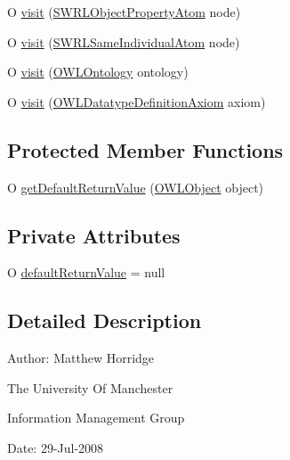 \begin{DoxyCompactItemize}
\item 
O \hyperlink{classorg_1_1semanticweb_1_1owlapi_1_1util_1_1_o_w_l_object_visitor_ex_adapter_3_01_o_01_4_ab8854cdd3a3703972d87a8ed1ac722f7}{visit} (\hyperlink{interfaceorg_1_1semanticweb_1_1owlapi_1_1model_1_1_s_w_r_l_object_property_atom}{S\-W\-R\-L\-Object\-Property\-Atom} node)
\item 
O \hyperlink{classorg_1_1semanticweb_1_1owlapi_1_1util_1_1_o_w_l_object_visitor_ex_adapter_3_01_o_01_4_ae101ab0edf2f74a98a6824e63f4ac0ee}{visit} (\hyperlink{interfaceorg_1_1semanticweb_1_1owlapi_1_1model_1_1_s_w_r_l_same_individual_atom}{S\-W\-R\-L\-Same\-Individual\-Atom} node)
\item 
O \hyperlink{classorg_1_1semanticweb_1_1owlapi_1_1util_1_1_o_w_l_object_visitor_ex_adapter_3_01_o_01_4_a223e64ad03ad0196f4633ee80980b14e}{visit} (\hyperlink{interfaceorg_1_1semanticweb_1_1owlapi_1_1model_1_1_o_w_l_ontology}{O\-W\-L\-Ontology} ontology)
\item 
O \hyperlink{classorg_1_1semanticweb_1_1owlapi_1_1util_1_1_o_w_l_object_visitor_ex_adapter_3_01_o_01_4_aa6d43e72d7127aff915b774075b41f40}{visit} (\hyperlink{interfaceorg_1_1semanticweb_1_1owlapi_1_1model_1_1_o_w_l_datatype_definition_axiom}{O\-W\-L\-Datatype\-Definition\-Axiom} axiom)
\end{DoxyCompactItemize}
\subsection*{Protected Member Functions}
\begin{DoxyCompactItemize}
\item 
O \hyperlink{classorg_1_1semanticweb_1_1owlapi_1_1util_1_1_o_w_l_object_visitor_ex_adapter_3_01_o_01_4_a0b247e547c1579b2a1b038cb7966af1e}{get\-Default\-Return\-Value} (\hyperlink{interfaceorg_1_1semanticweb_1_1owlapi_1_1model_1_1_o_w_l_object}{O\-W\-L\-Object} object)
\end{DoxyCompactItemize}
\subsection*{Private Attributes}
\begin{DoxyCompactItemize}
\item 
O \hyperlink{classorg_1_1semanticweb_1_1owlapi_1_1util_1_1_o_w_l_object_visitor_ex_adapter_3_01_o_01_4_a7bb72ed6adf4f306bbeefa524c0bca79}{default\-Return\-Value} = null
\end{DoxyCompactItemize}


\subsection{Detailed Description}
Author\-: Matthew Horridge\par
 The University Of Manchester\par
 Information Management Group\par
 Date\-: 29-\/\-Jul-\/2008\par
\par


